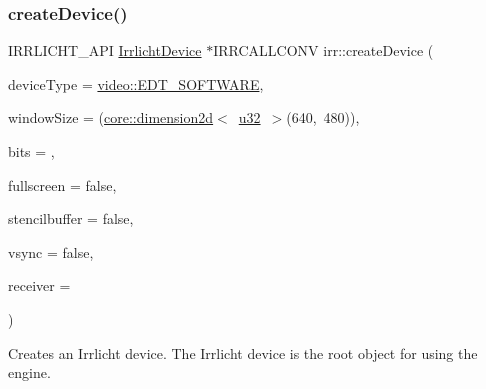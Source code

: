 \subsubsection{\texorpdfstring{create\+Device()}{createDevice()}}
{\footnotesize\ttfamily I\+R\+R\+L\+I\+C\+H\+T\+\_\+\+A\+PI \hyperlink{classirr_1_1IrrlichtDevice}{Irrlicht\+Device} $\ast$I\+R\+R\+C\+A\+L\+L\+C\+O\+NV irr\+::create\+Device (\begin{DoxyParamCaption}\item[{\hyperlink{namespaceirr_1_1video_ae35a6de6d436c76107ad157fe42356d0}{video\+::\+E\+\_\+\+D\+R\+I\+V\+E\+R\+\_\+\+T\+Y\+PE}}]{device\+Type = {\ttfamily \hyperlink{namespaceirr_1_1video_ae35a6de6d436c76107ad157fe42356d0ad863d9225d42c1f9ea1eb7ad89a712ce}{video\+::\+E\+D\+T\+\_\+\+S\+O\+F\+T\+W\+A\+RE}},  }\item[{const \hyperlink{classirr_1_1core_1_1dimension2d}{core\+::dimension2d}$<$ \hyperlink{namespaceirr_a0416a53257075833e7002efd0a18e804}{u32} $>$ \&}]{window\+Size = {\ttfamily (\hyperlink{classirr_1_1core_1_1dimension2d}{core\+::dimension2d}$<$~\hyperlink{namespaceirr_a0416a53257075833e7002efd0a18e804}{u32}~$>$(640,~480))},  }\item[{\hyperlink{namespaceirr_a0416a53257075833e7002efd0a18e804}{u32}}]{bits = {},  }\item[{bool}]{fullscreen = {\ttfamily false},  }\item[{bool}]{stencilbuffer = {\ttfamily false},  }\item[{bool}]{vsync = {\ttfamily false},  }\item[{\hyperlink{classirr_1_1IEventReceiver}{I\+Event\+Receiver} $\ast$}]{receiver = {} }\end{DoxyParamCaption})}



Creates an Irrlicht device. The Irrlicht device is the root object for using the engine. 

